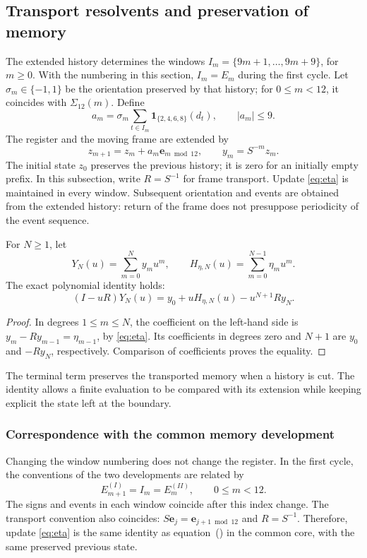 \subsection{Transport resolvents and preservation of memory}
\label{subsec:ii-memoria-resolvente}

The extended history determines the windows
\(I_m=\{9m+1,\ldots,9m+9\}\), for \(m\geq0\).
With the numbering in this section, \(I_m=E_m\) during the first cycle.
Let \(\sigma_m\in\{-1,1\}\) be the orientation preserved by that history;
for \(0\leq m<12\), it coincides with \(\Sigma_{12}(m)\). Define
\[
 a_m=\sigma_m\sum_{t\in I_m}\mathbf1_{\{2,4,6,8\}}(d_t),
 \qquad |a_m|\leq9.
\]
The register and the moving frame are extended by
\[
 z_{m+1}=z_m+a_m\mathbf e_{m\bmod12},\qquad y_m=S^{-m}z_m.
\]
The initial state \(z_0\) preserves the previous history; it is zero for
an initially empty prefix. In this subsection, write
\(R=S^{-1}\) for frame transport. Update
\eqref{eq:eta} is maintained in every window. Subsequent orientation and
events are obtained from the extended history: return of the frame
does not presuppose periodicity of the event sequence.

\begin{proposition}
For $N\geq1$, let
\[
Y_N(u)=\sum_{m=0}^N y_mu^m,\qquad
H_{\eta,N}(u)=\sum_{m=0}^{N-1}\eta_mu^m.
\]
The exact polynomial identity holds:
\begin{equation}
(I-uR)Y_N(u)=y_0+uH_{\eta,N}(u)-u^{N+1}Ry_N.
\label{mem:identidad-finita}
\end{equation}
\end{proposition}
\begin{proof}
In degrees $1\leq m\leq N$, the coefficient on the left-hand side is
$y_m-Ry_{m-1}=\eta_{m-1}$, by \eqref{eq:eta}.
Its coefficients in degrees zero and $N+1$ are $y_0$ and $-Ry_N$,
respectively. Comparison of coefficients proves the equality.
\end{proof}

The terminal term preserves the transported memory when a history is cut.
The identity allows a finite evaluation to be compared with its extension
while keeping explicit the state left at the boundary.


\subsubsection{Correspondence with the common memory development}

Changing the window numbering does not change the register. In the
first cycle, the conventions of the two developments are related by
\[
 E^{(I)}_{m+1}=I_m=E^{(II)}_m,\qquad 0\leq m<12.
\]
The signs and events in each window coincide after this
index change. The transport convention also coincides:
\(S\mathbf e_j=\mathbf e_{j+1\bmod12}\) and \(R=S^{-1}\).
Therefore, update \eqref{eq:eta} is the same identity as
equation~\textup{()} in the common
core, with the same preserved previous state.

